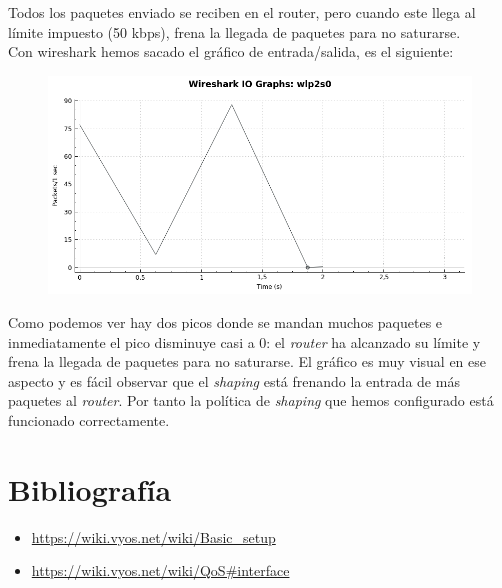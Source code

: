 \documentclass[11pt,a4paper]{article}
\begin{document}
Todos los paquetes enviado se reciben en el router, pero cuando este llega al límite impuesto (50 kbps), frena la llegada de paquetes para no saturarse.\\

Con wireshark hemos sacado el gráfico de entrada/salida, es el siguiente:

\begin{figure}[H]
	\centering
	\includegraphics[scale=0.5]{img/iostat.png}
\end{figure}

Como podemos ver hay dos picos donde se mandan muchos paquetes e inmediatamente el pico disminuye casi a 0: el \textit{router} ha alcanzado su límite y frena la llegada de paquetes para no saturarse. El gráfico es muy visual en ese aspecto y es fácil observar que el \textit{shaping} está frenando la entrada de más paquetes al \textit{router}. Por tanto la política de \textit{shaping} que hemos configurado está funcionado correctamente.

\section{Bibliografía}

\begin{itemize}
	\item \color{blue} \url{https://wiki.vyos.net/wiki/Basic_setup}\color{black}
	\item \color{blue} \url{https://wiki.vyos.net/wiki/QoS#interface}
\end{itemize}
\end{document}
